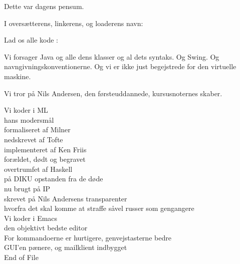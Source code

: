 \documentclass[a4paper,11pt]{article}
\begin{document}
\begin{sketch}

   Dette var dagens pensum.


   I oversætterens, linkerens, og loaderens navn: 
  
   Lad os alle kode :

   Vi forsager Java og alle dens klasser og al dets syntaks.  Og
  Swing.  Og navngivningskonventionerne.  Og vi er ikke just
  begejstrede for den virtuelle maskine.

   Vi tror på Nils Andersen, den førsteuddannede,
  kursusnoternes skaber.

  Vi koder i ML\\
  hans modersmål\\
  formaliseret af Milner\\
  nedskrevet af Tofte\\
  implementeret af Ken Friis\\
  forældet, dødt og begravet\\
  overtrumfet af Haskell\\
  på DIKU opstanden fra de døde\\
  nu brugt på IP\\
  skrevet på Nils Andersens transparenter\\
  hvorfra det skal komme at straffe såvel russer som gengangere\\

  Vi koder i Emacs\\
  den objektivt bedste editor\\
  For kommandoerne er hurtigere, genvejstasterne bedre\\
  GUI'en pænere, og mailklient indbygget\\
  End of File
\end{sketch}
\end{document}
